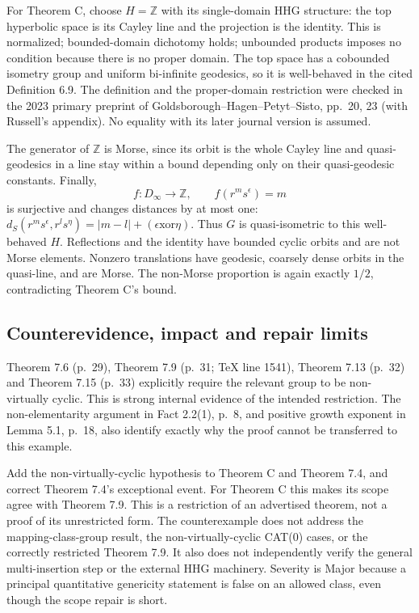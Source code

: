 \documentclass[10pt]{article}
\begin{document}
For Theorem C, choose \(H=\mathbb Z\) with its single-domain HHG structure: the top hyperbolic space is its Cayley line and the projection is the identity. This is normalized; bounded-domain dichotomy holds; unbounded products imposes no condition because there is no proper domain. The top space has a cobounded isometry group and uniform bi-infinite geodesics, so it is well-behaved in the cited Definition 6.9. The definition and the proper-domain restriction were checked in the 2023 primary preprint of Goldsborough–Hagen–Petyt–Sisto, pp. 20, 23 (with Russell’s appendix). No equality with its later journal version is assumed.\par
The generator of \(\mathbb Z\) is Morse, since its orbit is the whole Cayley line and quasi-geodesics in a line stay within a bound depending only on their quasi-geodesic constants. Finally, \[f:D_\infty\longrightarrow\mathbb Z,\qquad f(r^m s^\epsilon)=m\] is surjective and changes distances by at most one: \(d_S(r^m s^\epsilon,r^l s^\eta)=|m-l|+(\epsilon\mathbin{\mathrm{xor}}\eta)\). Thus \(G\) is quasi-isometric to this well-behaved \(H\). Reflections and the identity have bounded cyclic orbits and are not Morse elements. Nonzero translations have geodesic, coarsely dense orbits in the quasi-line, and are Morse. The non-Morse proportion is again exactly \(1/2\), contradicting Theorem C’s bound.\par
\subsection*{Counterevidence, impact and repair limits}
Theorem 7.6 (p. 29), Theorem 7.9 (p. 31; TeX line 1541), Theorem 7.13 (p. 32) and Theorem 7.15 (p. 33) explicitly require the relevant group to be non-virtually cyclic. This is strong internal evidence of the intended restriction. The non-elementarity argument in Fact 2.2(1), p. 8, and positive growth exponent in Lemma 5.1, p. 18, also identify exactly why the proof cannot be transferred to this example.\par
Add the non-virtually-cyclic hypothesis to Theorem C and Theorem 7.4, and correct Theorem 7.4’s exceptional event. For Theorem C this makes its scope agree with Theorem 7.9. This is a restriction of an advertised theorem, not a proof of its unrestricted form. The counterexample does not address the mapping-class-group result, the non-virtually-cyclic CAT(0) cases, or the correctly restricted Theorem 7.9. It also does not independently verify the general multi-insertion step or the external HHG machinery. Severity is Major because a principal quantitative genericity statement is false on an allowed class, even though the scope repair is short.\par
\end{document}
